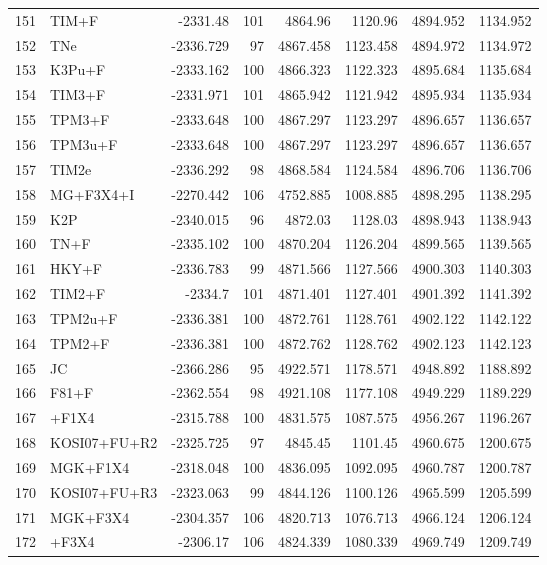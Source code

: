 \begin{longtable}{clrrrrrr}
	151 & TIM+F & -2331.48 & 101 & 4864.96 & 1120.96 & 4894.952 & 1134.952 \\ 
	152 & TNe & -2336.729 & 97 & 4867.458 & 1123.458 & 4894.972 & 1134.972 \\ 
	153 & K3Pu+F & -2333.162 & 100 & 4866.323 & 1122.323 & 4895.684 & 1135.684 \\ 
	154 & TIM3+F & -2331.971 & 101 & 4865.942 & 1121.942 & 4895.934 & 1135.934 \\ 
	155 & TPM3+F & -2333.648 & 100 & 4867.297 & 1123.297 & 4896.657 & 1136.657 \\ 
	156 & TPM3u+F & -2333.648 & 100 & 4867.297 & 1123.297 & 4896.657 & 1136.657 \\ 
	157 & TIM2e & -2336.292 & 98 & 4868.584 & 1124.584 & 4896.706 & 1136.706 \\ 
	158 & MG+F3X4+I & -2270.442 & 106 & 4752.885 & 1008.885 & 4898.295 & 1138.295 \\ 
	159 & K2P & -2340.015 & 96 & 4872.03 & 1128.03 & 4898.943 & 1138.943 \\ 
	160 & TN+F & -2335.102 & 100 & 4870.204 & 1126.204 & 4899.565 & 1139.565 \\ 
	161 & HKY+F & -2336.783 & 99 & 4871.566 & 1127.566 & 4900.303 & 1140.303 \\ 
	162 & TIM2+F & -2334.7 & 101 & 4871.401 & 1127.401 & 4901.392 & 1141.392 \\ 
	163 & TPM2u+F & -2336.381 & 100 & 4872.761 & 1128.761 & 4902.122 & 1142.122 \\ 
	164 & TPM2+F & -2336.381 & 100 & 4872.762 & 1128.762 & 4902.123 & 1142.123 \\ 
	165 & JC & -2366.286 & 95 & 4922.571 & 1178.571 & 4948.892 & 1188.892 \\ 
	166 & F81+F & -2362.554 & 98 & 4921.108 & 1177.108 & 4949.229 & 1189.229 \\ 
	167 & \gy+F1X4 & -2315.788 & 100 & 4831.575 & 1087.575 & 4956.267 & 1196.267 \\ 
	168 & KOSI07+FU+R2 & -2325.725 & 97 & 4845.45 & 1101.45 & 4960.675 & 1200.675 \\ 
	169 & MGK+F1X4 & -2318.048 & 100 & 4836.095 & 1092.095 & 4960.787 & 1200.787 \\ 
	170 & KOSI07+FU+R3 & -2323.063 & 99 & 4844.126 & 1100.126 & 4965.599 & 1205.599 \\ 
	171 & MGK+F3X4 & -2304.357 & 106 & 4820.713 & 1076.713 & 4966.124 & 1206.124 \\ 
	172 & \gy+F3X4 & -2306.17 & 106 & 4824.339 & 1080.339 & 4969.749 & 1209.749 \\ 

\end{longtable}
